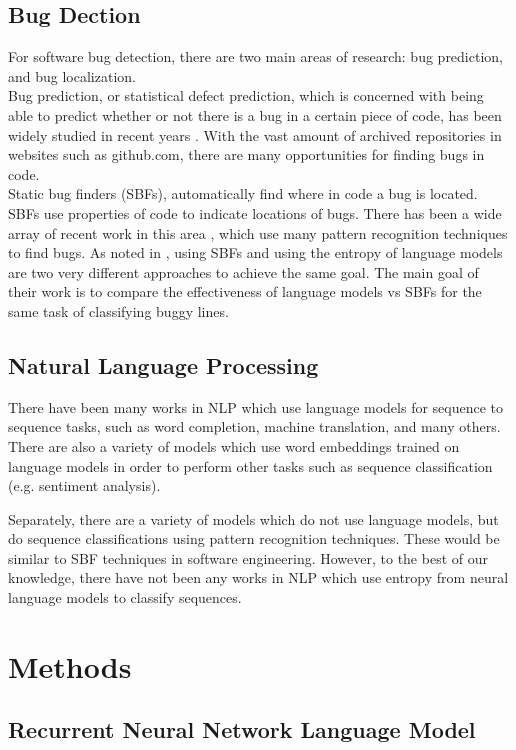 \documentclass{article}
\begin{document}
\subsection{Bug Dection}
For software bug detection, there are two main areas of research: bug prediction, and bug localization. \\
Bug prediction, or statistical defect prediction, which is concerned with being able to predict whether or not there is a bug in a certain piece of code, has been widely studied in recent years \citep{catal2009systematic}. With the vast amount of archived repositories in websites such as github.com, there are many opportunities for finding bugs in code.\\
Static bug finders (SBFs), automatically find where in code a bug is located. SBFs use properties of code to indicate locations of bugs. There has been a wide array of recent work in this area \citep{rahman2014comparing}, which use many pattern recognition techniques to find bugs. As noted in \cite{ray2015naturalness}, using SBFs and using the entropy of language models are two very different approaches to achieve the same goal. The main goal of their work is to compare the effectiveness of language models vs SBFs for the same task of classifying buggy lines.

\subsection{Natural Language Processing}
There have been many works in NLP which use language models for sequence to sequence tasks, such as word completion, machine translation, and many others. There are also a variety of models which use word embeddings trained on language models in order to perform other tasks such as sequence classification (e.g. sentiment analysis). 

Separately, there are a variety of models which do not use language models, but do sequence classifications using pattern recognition techniques. These would be similar to SBF techniques in software engineering. However, to the best of our knowledge, there have not been any works in NLP which use entropy from neural language models to classify sequences.

\section{Methods}

\subsection{Recurrent Neural Network Language Model}
\end{document}
